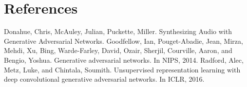 \documentclass{article}
\begin{document}
\section{References}

Donahue, Chris, McAuley, Julian, Puckette, Miller. Synthesizing Audio with Generative Adversarial Networks.
\newline
\newline
Goodfellow, Ian, Pouget-Abadie, Jean, Mirza, Mehdi, Xu, Bing, Warde-Farley, David, Ozair, Sherjil, Courville, Aaron, and Bengio, Yoshua. Generative adversarial networks. In NIPS, 2014.
\newline
\newline
Radford, Alec, Metz, Luke, and Chintala, Soumith. Unsupervised representation learning with deep convolutional generative adversarial networks. In ICLR, 2016.

\end{document}
